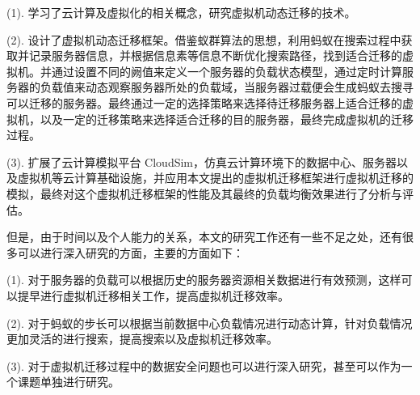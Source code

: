     (1). 学习了云计算及虚拟化的相关概念，研究虚拟机动态迁移的技术。
    
    (2). 设计了虚拟机动态迁移框架。借鉴蚁群算法的思想，利用蚂蚁在搜索过程中获取并记录服务器信息，并根据信息素等信息不断优化搜索路径，找到适合迁移的虚拟机。并通过设置不同的阙值来定义一个服务器的负载状态模型，通过定时计算服务器的负载值来动态观察服务器所处的负载域，当服务器过载便会生成蚂蚁去搜寻可以迁移的服务器。最终通过一定的选择策略来选择待迁移服务器上适合迁移的虚拟机，以及一定的迁移策略来选择适合迁移的目的服务器，最终完成虚拟机的迁移过程。

    (3). 扩展了云计算模拟平台 CloudSim，仿真云计算环境下的数据中心、服务器以及虚拟机等云计算基础设施，并应用本文提出的虚拟机迁移框架进行虚拟机迁移的模拟，最终对这个虚拟机迁移框架的性能及其最终的负载均衡效果进行了分析与评估。

但是，由于时间以及个人能力的关系，本文的研究工作还有一些不足之处，还有很多可以进行深入研究的方面，主要的方面如下：

    (1). 对于服务器的负载可以根据历史的服务器资源相关数据进行有效预测，这样可以提早进行虚拟机迁移相关工作，提高虚拟机迁移效率。

    (2). 对于蚂蚁的步长可以根据当前数据中心负载情况进行动态计算，针对负载情况更加灵活的进行搜索，提高搜索以及虚拟机迁移效率。
    
    (3). 对于虚拟机迁移过程中的数据安全问题也可以进行深入研究，甚至可以作为一个课题单独进行研究。



























